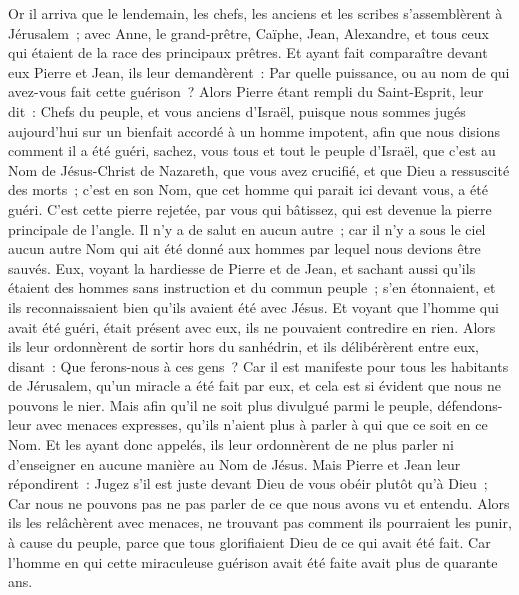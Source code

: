 \begin{multicols}{2}
Or il arriva que le lendemain, les chefs, les anciens et les scribes s'assemblèrent à Jérusalem~;
avec Anne, le grand-prêtre, Caïphe, Jean, Alexandre, et tous ceux qui étaient de la race des principaux prêtres.
Et ayant fait comparaître devant eux Pierre et Jean, ils leur demandèrent~: Par quelle puissance, ou au nom de qui avez-vous fait cette guérison~?
Alors Pierre étant rempli du Saint-Esprit, leur dit~: Chefs du peuple, et vous anciens d'Israël,
puisque nous sommes jugés aujourd'hui sur un bienfait accordé à un homme impotent, afin que nous disions comment il a été guéri,
sachez, vous tous et tout le peuple d'Israël, que c'est au Nom de Jésus-Christ de Nazareth, que vous avez crucifié, et que Dieu a ressuscité des morts~; c'est en son Nom, que cet homme qui parait ici devant vous, a été guéri.
C'est cette pierre rejetée, par vous qui bâtissez, qui est devenue la pierre principale de l'angle.
Il n'y a de salut en aucun autre~; car il n'y a sous le ciel aucun autre Nom qui ait été donné aux hommes par lequel nous devions être sauvés.
Eux, voyant la hardiesse de Pierre et de Jean, et sachant aussi qu'ils étaient des hommes sans instruction et du commun peuple~; s'en étonnaient, et ils reconnaissaient bien qu'ils avaient été avec Jésus.
Et voyant que l'homme qui avait été guéri, était présent avec eux, ils ne pouvaient contredire en rien.
Alors ils leur ordonnèrent de sortir hors du sanhédrin, et ils délibérèrent entre eux, disant~: Que ferons-nous à ces gens~?
Car il est manifeste pour tous les habitants de Jérusalem, qu'un miracle a été fait par eux, et cela est si évident que nous ne pouvons le nier.
Mais afin qu'il ne soit plus divulgué parmi le peuple, défendons-leur avec menaces expresses, qu'ils n'aient plus à parler à qui que ce soit en ce Nom.
Et les ayant donc appelés, ils leur ordonnèrent de ne plus parler ni d'enseigner en aucune manière au Nom de Jésus.
Mais Pierre et Jean leur répondirent~: Jugez s'il est juste devant Dieu de vous obéir plutôt qu'à Dieu~;
Car nous ne pouvons pas ne pas parler de ce que nous avons vu et entendu.
Alors ils les relâchèrent avec menaces, ne trouvant pas comment ils pourraient les punir, à cause du peuple, parce que tous glorifiaient Dieu de ce qui avait été fait.
Car l'homme en qui cette miraculeuse guérison avait été faite avait plus de quarante ans.

\end{multicols}
